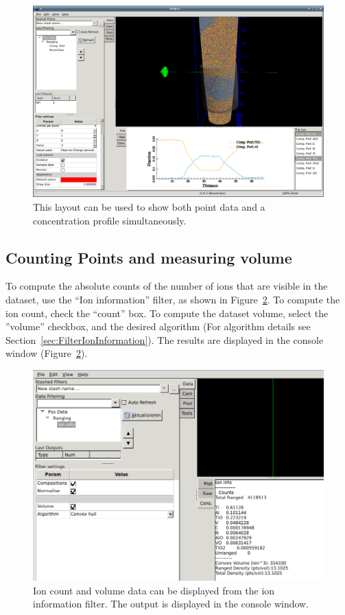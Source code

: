 \documentclass[10pt]{article}
\begin{document}
\begin{figure}[h]
\centering
 \includegraphics[width=0.85 \textwidth,keepaspectratio=true]{./figures/quickStartConcLayout.png}

 \caption{This layout can be used to show both point data and a concentration profile simultaneously.}
\label{fig:quickStartConcLayout}
\end{figure}



\subsection{Counting Points and measuring volume}

To compute the absolute counts of the number of ions that are visible in the dataset, use the ``Ion information'' filter, as shown in Figure~\ref{fig:quickStartIonInfoLayout}. To compute the ion count, check the ``count'' box. To compute the dataset volume, select the ''volume'' checkbox, and the desired algorithm (For algorithm details see Section~\ref{sec:FilterIonInformation}). The results are displayed in the console window (Figure~\ref{fig:quickStartIonInfoLayout}).

\begin{figure}[h]
\centering
 \includegraphics[width=0.85 \textwidth,keepaspectratio=true]{./figures/quickStartIonInfoLayout.png}

 \caption{Ion count and volume data can be displayed from the ion information filter. The output is displayed in the console window.}
\label{fig:quickStartIonInfoLayout}
\end{figure}
\end{document}
